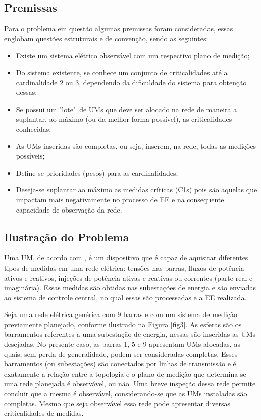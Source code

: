 \documentclass[12pt]{article}
\begin{document}
\subsection{Premissas}

Para o problema em questão algumas premissas foram consideradas, essas englobam questões estruturais e de convenção, sendo as seguintes:

\begin{itemize}
	\item Existe um sistema elétrico observável com um respectivo plano de medição;
	
	\item Do sistema existente, se conhece um conjunto de criticalidades até a cardinalidade 2 ou 3, dependendo da dificuldade do sistema para obtenção dessas;
	
	\item Se possui um "lote"~de UMs que deve ser alocado na rede de maneira a suplantar, ao máximo (ou da melhor forma possível), as criticalidades conhecidas;

	\item As UMs inseridas são completas, ou seja, inserem, na rede, todas as medições possíveis;
		
	\item Define-se prioridades (pesos) para as cardinalidades;
	
	\item Deseja-se suplantar ao máximo as medidas críticas (C1s) pois são aquelas que impactam mais negativamente no processo de EE e na consequente capacidade de observação da rede.
\end{itemize}

\subsection{Ilustração do Problema}	
	
	 Uma UM, de acordo com \cite{CritMU}, é um dispositivo que é capaz de aquisitar diferentes tipos de medidas em uma rede elétrica: tensões nas barras, fluxos de potência ativos e reativos, injeções de potência ativas e reativas ou correntes (parte real e imaginária). Essas medidas são obtidas nas subestações de energia e são enviadas ao sistema de controle central, no qual essas são processadas e a EE realizada.
	 
	Seja uma rede elétrica genérica com 9 barras e com um sistema de medição previamente planejado, conforme ilustrado na Figura \ref{fig3}. As esferas são os barramentos referentes a uma subestação de energia, nessas são inseridas as UMs desejadas. No presente caso, as barras 1, 5 e 9 apresentam UMs alocadas, as quais, sem perda de generalidade, podem ser consideradas completas. Esses barramentos (ou subestações) são conectados por linhas de transmissão e é exatamente a relação entre a topologia e o plano de medição que determina se uma rede planejada é observável, ou não. Uma breve inspeção dessa rede permite concluir que a mesma é observável, considerando-se que as UMs instaladas são completas. Mesmo que seja observável essa rede pode apresentar diversas criticalidades de medidas.
	
\end{document}
